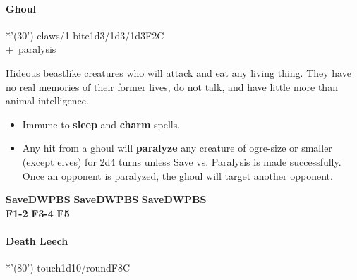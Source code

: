 \documentclass[english,11pt,openany,letterpaper,twocolumn]{book}
\begin{document}
\skipline
\hypertarget{ghoul}{}
\paragraph{Ghoul}
*'(30') claws/1 bite\tab 1d3/1d3/1d3\tab F2\tab C
\\+~paralysis

Hideous beastlike creatures who will attack and eat any living thing. They have no real memories of their former lives, do not talk, and have little more than animal intelligence.
\begin{itemize}[leftmargin=*,label=\itshape\textbullet]
\item
Immune to \textbf{sleep} and \textbf{charm} spells.
\item
Any hit from a ghoul will \textbf{paralyze} any creature of ogre-size or smaller (except elves) for 2d4 turns unless Save vs. Paralysis is made successfully. Once an opponent is paralyzed, the ghoul will target another opponent.
\end{itemize}

\vfill


\overprintw[24\charwidth]{\_}%
\textbf{Save\tab D\tab W\tab P\tab B\tab S}\tab
\overprintw[24\charwidth]{\_}%
\textbf{Save\tab D\tab W\tab P\tab B\tab S}\tab
\overprintw[24\charwidth]{\_}%
\textbf{Save\tab D\tab W\tab P\tab B\tab S}\\
\textbf{F1-2}\tab
\textbf{F3-4}\tab
\textbf{F5}

\break

\setUndeadTabPositions{}

\hypertarget{leech}{}
\paragraph{Death Leech}
*'(80') touch\tab 1d10/round\tab F8\tab C
\end{document}
